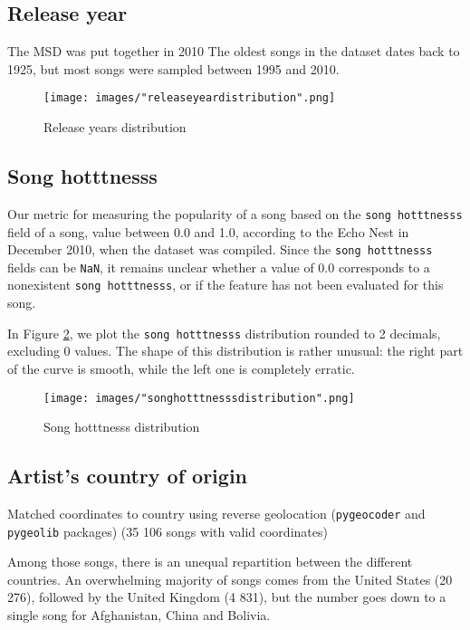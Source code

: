 \documentclass[11pt]{article}
\renewcommand\_{\textunderscore\allowbreak}
\begin{document}
\subsection{Release year}
The MSD was put together in 2010
The oldest songs in the dataset dates back to 1925, but most songs were sampled between 1995 and 2010.

\begin{figure}[h!]
\centering
\captionsetup{width=1.0\textwidth}
\texttt{[image: images/"release\_year\_distribution".png]}
\caption{Release years distribution}
\label{fig:song_duration}
\end{figure}

\subsection{Song hotttnesss}
Our metric for measuring the popularity of a song based on the \texttt{song hotttnesss} field of a song, value between 0.0 and 1.0, according to the Echo Nest in December 2010, when the dataset was compiled.
Since the \texttt{song hotttnesss} fields can be \texttt{NaN}, it remains unclear whether a value of 0.0 corresponds to a nonexistent \texttt{song hotttnesss}, or if the feature has not been evaluated for this song.

In Figure \ref{fig:song_hotttnesss_distribution}, we plot the \texttt{song hotttnesss} distribution rounded to 2 decimals, excluding 0 values. 
The shape of this distribution is rather unusual: the right part of the curve is smooth, while the left one is completely erratic.

\begin{figure}[h!]
\centering
\captionsetup{width=1.0\textwidth}
\texttt{[image: images/"song\_hotttnesss\_distribution".png]}
\caption{Song hotttnesss distribution}
\label{fig:song_hotttnesss_distribution}
\end{figure}

\subsection{Artist's country of origin}
Matched coordinates to country using reverse geolocation (\texttt{pygeocoder} and \texttt{pygeolib} packages) (35 106 songs with valid coordinates)

Among those songs, there is an unequal repartition between the different countries.
An overwhelming majority of songs comes from the United States (20 276), followed by the United Kingdom (4 831), but the number goes down to a single song for Afghanistan, China and Bolivia.
\end{document}
